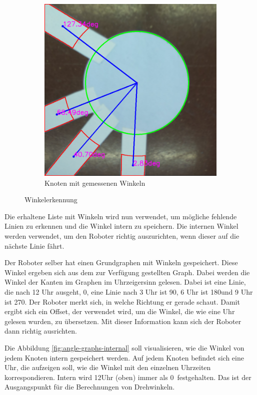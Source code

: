 \begin{figure}[H]
\begin{subfigure}{0.45\textwidth}
\includegraphics[width=0.95\linewidth]{assets/informatik-prototyp/opencv/angle_detection/node_with_edge_angles_annotated.png} 
\caption{Knoten mit gemessenen Winkeln}
\label{fig:node-angles}
\end{subfigure}

\caption{Winkelerkennung}
\label{fig:angle-recognition}
\end{figure}

Die erhaltene Liste mit Winkeln wird nun verwendet, um mögliche fehlende Linien zu erkennen und die Winkel intern zu speichern. Die internen Winkel werden verwendet, um den Roboter richtig auszurichten, wenn dieser auf die nächste Linie fährt.

Der Roboter selber hat einen Grundgraphen mit Winkeln gespeichert. Diese Winkel ergeben sich aus dem zur Verfügung gestellten Graph. Dabei werden die Winkel der Kanten im Graphen im Uhrzeigersinn gelesen. Dabei ist eine Linie, die nach 12 Uhr ausgeht, 0\textdegree, eine Linie nach 3 Uhr ist 90\textdegree, 6 Uhr ist 180\textdegree und 9 Uhr ist 270\textdegree. Der Roboter merkt sich, in welche Richtung er gerade schaut. Damit ergibt sich ein Offset, der verwendet wird, um die Winkel, die wie eine Uhr gelesen wurden, zu übersetzen. Mit dieser Information kann sich der Roboter dann richtig ausrichten.

Die Abbildung \ref{fig:angle-graphs-internal} soll visualisieren, wie die Winkel von jedem Knoten intern gespeichert werden. Auf jedem Knoten befindet sich eine Uhr, die aufzeigen soll, wie die Winkel mit den einzelnen Uhrzeiten korrespondieren. Intern wird 12Uhr (oben) immer als 0\textdegree\ festgehalten. Das ist der Ausgangspunkt für die Berechnungen von Drehwinkeln.

